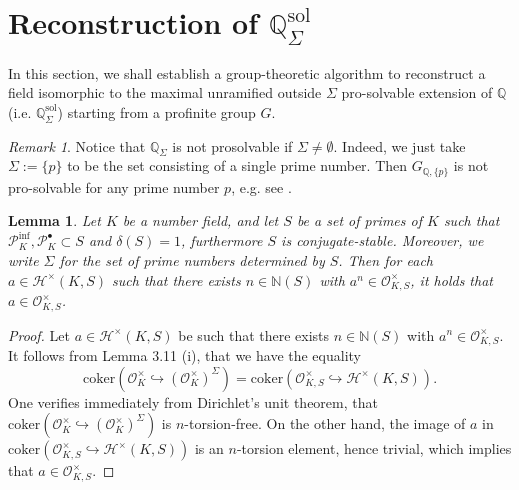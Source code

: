 \documentclass{article}
\theoremstyle{plain}
\newtheorem{lem}[thm]{Lemma}
\theoremstyle{definition}
\theoremstyle{remark}
\newtheorem{rem}[thm]{Remark}
\begin{document}
\section{Reconstruction of $\mathbb{Q}_{\Sigma}^{\text{sol}}$}
In this section, we shall establish a group-theoretic algorithm to reconstruct a field isomorphic to the maximal unramified outside $\Sigma$ pro-solvable extension of $\mathbb Q$ (i.e. $\mathbb Q_{\Sigma}^{\text{sol}}$) starting from a profinite group $G$. 
\begin{rem}
Notice that $\mathbb Q_{\Sigma}$ is not prosolvable if $\Sigma \neq \emptyset$. Indeed, we just take $\Sigma := \{p\}$ to be the set consisting of a single prime number. Then $G_{\mathbb Q,\{p\}}$ is not pro-solvable for any prime number $p$, e.g. see \cite{Ram2}.
\end{rem}

\begin{lem}
Let $K$ be a number field, and let $S$ be a set of primes of $K$ such that $\mathscr{P}_K^{\text{inf}},\mathscr{P}_K^{\bullet} \subset S$ and $\delta(S) = 1$, furthermore $S$ is conjugate-stable. Moreover, we write $\Sigma$ for the set of prime numbers determined by $S$. Then for each $a \in \mathcal{H}^{\times}(K,S)$ such that there exists $n \in\mathbb N(S)$ with $a^n \in \mathcal{O}_{K,S}^{\times}$, it holds that $a \in \mathcal{O}_{K,S}^{\times}$.
\end{lem}
\begin{proof}
Let $a \in \mathcal{H}^{\times}(K,S)$ be such that there exists $n \in \mathbb N(S)$ with $a^n \in \mathcal{O}_{K,S}^{\times}$. It follows from Lemma 3.11 (i), that we have the equality
$$
\text{coker}(\mathcal{O}_{K}^{\times} \hookrightarrow (\mathcal{O}_{K}^{\times})^{\Sigma}) = \text{coker}(\mathcal{O}_{K,S}^{\times} \hookrightarrow \mathcal{H}^{\times}(K,S)).
$$
One verifies immediately from Dirichlet's unit theorem, that $\text{coker}(\mathcal{O}_K^{\times} \hookrightarrow (\mathcal{O}_K^{\times})^{\Sigma})$ is $n$-torsion-free. On the other hand, the image of $a$ in $\text{coker}(\mathcal{O}_{K,S}^{\times} \hookrightarrow \mathcal{H}^{\times}(K,S))$ is an $n$-torsion element, hence trivial, which implies that $a \in \mathcal{O}_{K,S}^{\times}$.
\end{proof}
\end{document}

